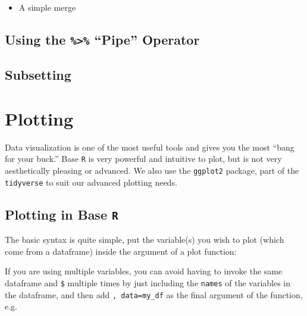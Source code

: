 \documentclass[]{book}
\newenvironment{Shaded}{\begin{snugshade}}{\end{snugshade}}
\newcommand{\KeywordTok}[1]{\textcolor[rgb]{0.13,0.29,0.53}{\textbf{#1}}}
\newcommand{\OperatorTok}[1]{\textcolor[rgb]{0.81,0.36,0.00}{\textbf{#1}}}
\newcommand{\NormalTok}[1]{#1}
\providecommand{\tightlist}{%
  \setlength{\itemsep}{0pt}\setlength{\parskip}{0pt}}
\theoremstyle{definition}
\theoremstyle{definition}
\theoremstyle{definition}
\theoremstyle{remark}
\begin{document}
\begin{itemize}
\tightlist
\item
  A simple merge
\end{itemize}

\section{\texorpdfstring{Using the \texttt{\%\textgreater{}\%} ``Pipe''
Operator}{Using the \%\textgreater{}\% Pipe Operator}}\label{using-the-pipe-operator}

\section{Subsetting}\label{subsetting}

\section{}\label{section}

\hypertarget{plotting}{\chapter{Plotting}\label{plotting}}

Data visualization is one of the most useful tools and gives you the
most ``bang for your buck.'' Base \texttt{R} is very powerful and
intuitive to plot, but is not very aesthetically pleasing or advanced.
We also use the \texttt{ggplot2} package, part of the \texttt{tidyverse}
to suit our advanced plotting needs.

\section{\texorpdfstring{Plotting in Base
\texttt{R}}{Plotting in Base R}}\label{plotting-in-base-r}

The basic syntax is quite simple, put the variable(s) you wish to plot
(which come from a dataframe) inside the argument of a plot function:

\begin{Shaded}
\end{Shaded}

If you are using multiple variables, you can avoid having to invoke the
same dataframe and \texttt{\$} multiple times by just including the
\texttt{names} of the variables in the dataframe, and then add
\texttt{,\ data=my\_df} as the final argument of the function, e.g.
\end{document}

